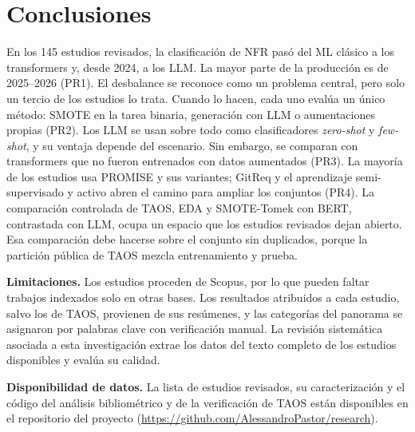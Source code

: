 \documentclass[conference]{IEEEtran}
\begin{document}
\section{Conclusiones}
En los 145 estudios revisados, la clasificación de NFR pasó del ML clásico a los transformers y, desde 2024, a los LLM. La mayor parte de la producción es de 2025--2026 (PR1). El desbalance se reconoce como un problema central, pero solo un tercio de los estudios lo trata. Cuando lo hacen, cada uno evalúa un único método: SMOTE en la tarea binaria, generación con LLM o aumentaciones propias (PR2). Los LLM se usan sobre todo como clasificadores \emph{zero-shot} y \emph{few-shot}, y su ventaja depende del escenario. Sin embargo, se comparan con transformers que no fueron entrenados con datos aumentados (PR3). La mayoría de los estudios usa PROMISE y sus variantes; GitReq y el aprendizaje semi-supervisado y activo abren el camino para ampliar los conjuntos (PR4). La comparación controlada de TAOS, EDA y SMOTE-Tomek con BERT, contrastada con LLM, ocupa un espacio que los estudios revisados dejan abierto. Esa comparación debe hacerse sobre el conjunto sin duplicados, porque la partición pública de TAOS mezcla entrenamiento y prueba.

\textbf{Limitaciones.} Los estudios proceden de Scopus, por lo que pueden faltar trabajos indexados solo en otras bases. Los resultados atribuidos a cada estudio, salvo los de TAOS, provienen de sus resúmenes, y las categorías del panorama se asignaron por palabras clave con verificación manual. La revisión sistemática asociada a esta investigación extrae los datos del texto completo de los estudios disponibles y evalúa su calidad.

\textbf{Disponibilidad de datos.} La lista de estudios revisados, su caracterización y el código del análisis bibliométrico y de la verificación de TAOS están disponibles en el repositorio del proyecto (\url{https://github.com/AlessandroPastor/research}).



\end{document}
